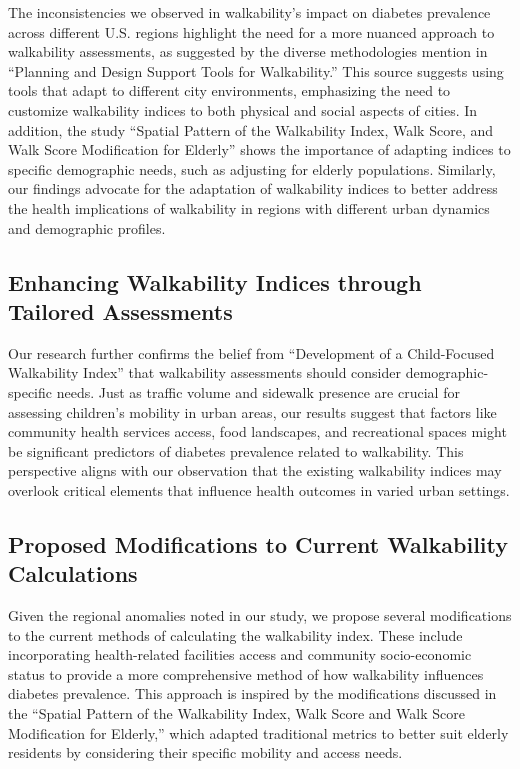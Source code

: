 \documentclass[
]{article}
\begin{document}
The inconsistencies we observed in walkability's impact on diabetes
prevalence across different U.S. regions highlight the need for a more
nuanced approach to walkability assessments, as suggested by the diverse
methodologies mention in ``Planning and Design Support Tools for
Walkability.'' This source suggests using tools that adapt to different
city environments, emphasizing the need to customize walkability indices
to both physical and social aspects of cities. In addition, the study
``Spatial Pattern of the Walkability Index, Walk Score, and Walk Score
Modification for Elderly'' shows the importance of adapting indices to
specific demographic needs, such as adjusting for elderly populations.
Similarly, our findings advocate for the adaptation of walkability
indices to better address the health implications of walkability in
regions with different urban dynamics and demographic profiles.

\subsection{Enhancing Walkability Indices through Tailored
Assessments}\label{enhancing-walkability-indices-through-tailored-assessments}

Our research further confirms the belief from ``Development of a
Child-Focused Walkability Index'' that walkability assessments should
consider demographic-specific needs. Just as traffic volume and sidewalk
presence are crucial for assessing children's mobility in urban areas,
our results suggest that factors like community health services access,
food landscapes, and recreational spaces might be significant predictors
of diabetes prevalence related to walkability. This perspective aligns
with our observation that the existing walkability indices may overlook
critical elements that influence health outcomes in varied urban
settings.

\subsection{Proposed Modifications to Current Walkability
Calculations}\label{proposed-modifications-to-current-walkability-calculations}

Given the regional anomalies noted in our study, we propose several
modifications to the current methods of calculating the walkability
index. These include incorporating health-related facilities access and
community socio-economic status to provide a more comprehensive method
of how walkability influences diabetes prevalence. This approach is
inspired by the modifications discussed in the ``Spatial Pattern of the
Walkability Index, Walk Score and Walk Score Modification for Elderly,''
which adapted traditional metrics to better suit elderly residents by
considering their specific mobility and access needs.
\end{document}
